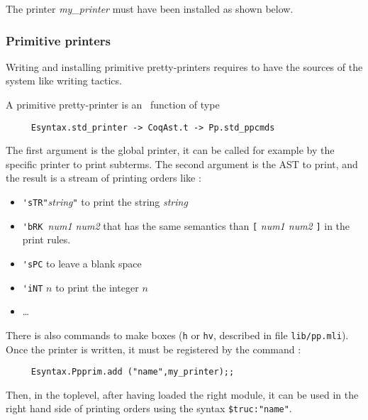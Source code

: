 {%

The printer \textit{my\_printer} must have been installed as shown
below.

\subsubsection{Primitive printers}

Writing and installing primitive pretty-printers requires to have the
sources of the system like writing tactics.

A primitive pretty-printer is an \ocaml\ function of type
\begin{verbatim}
     Esyntax.std_printer -> CoqAst.t -> Pp.std_ppcmds
\end{verbatim}
The first
argument is the global printer, it can be called for example by the
specific printer to print subterms. The second argument is the AST to
print, and the result is a stream of printing orders like :

\begin{itemize}
\item \verb+'sTR"+\textit{string}\verb+"+ to print the string
  \textit{string}
\item \verb+'bRK +\textit{num1 num2} that has the same semantics than
  \verb+[+ \textit{num1 num2} \verb+]+ in the print rules.
\item \verb+'sPC+ to leave a blank space
\item \verb+'iNT+ $n$ to print the integer $n$ 
\item \ldots
\end{itemize}

There is also commands to make boxes (\verb+h+ or \verb+hv+, described
in file {\tt lib/pp.mli}). Once the printer is written, it
must be registered by the command :
\begin{verbatim}
     Esyntax.Ppprim.add ("name",my_printer);;
\end{verbatim}
\noindent 
Then, in the toplevel, after having loaded the right {\ocaml} module,
it can be used in the right hand side of printing orders using the
syntax \verb+$truc:"name"+.

}
